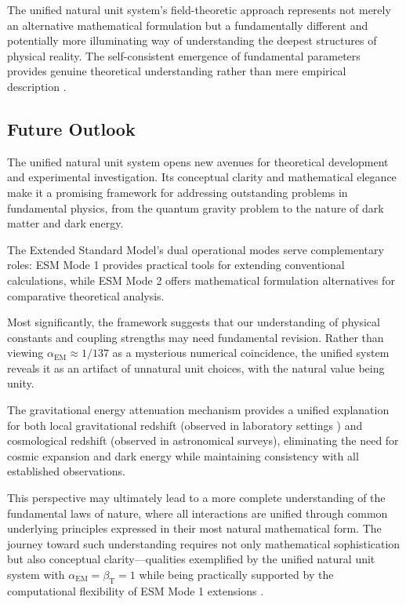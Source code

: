 \documentclass[12pt,a4paper]{article}
\newcommand{\alphaEM}{\alpha_{\text{EM}}}
\newcommand{\betaT}{\beta_{\text{T}}}
\begin{document}
	The unified natural unit system's field-theoretic approach represents not merely an alternative mathematical formulation but a fundamentally different and potentially more illuminating way of understanding the deepest structures of physical reality. The self-consistent emergence of fundamental parameters provides genuine theoretical understanding rather than mere empirical description \cite{pascher_pragmatic_2025}.
	
	\subsection{Future Outlook}
	\label{subsec:future_outlook}
	
	The unified natural unit system opens new avenues for theoretical development and experimental investigation. Its conceptual clarity and mathematical elegance make it a promising framework for addressing outstanding problems in fundamental physics, from the quantum gravity problem to the nature of dark matter and dark energy.
	
	The Extended Standard Model's dual operational modes serve complementary roles: ESM Mode 1 provides practical tools for extending conventional calculations, while ESM Mode 2 offers mathematical formulation alternatives for comparative theoretical analysis.
	
	Most significantly, the framework suggests that our understanding of physical constants and coupling strengths may need fundamental revision. Rather than viewing $\alphaEM \approx 1/137$ as a mysterious numerical coincidence, the unified system reveals it as an artifact of unnatural unit choices, with the natural value being unity.
	
	The gravitational energy attenuation mechanism provides a unified explanation for both local gravitational redshift (observed in laboratory settings \cite{Pound1960}) and cosmological redshift (observed in astronomical surveys), eliminating the need for cosmic expansion and dark energy while maintaining consistency with all established observations.
	
	This perspective may ultimately lead to a more complete understanding of the fundamental laws of nature, where all interactions are unified through common underlying principles expressed in their most natural mathematical form. The journey toward such understanding requires not only mathematical sophistication but also conceptual clarity—qualities exemplified by the unified natural unit system with $\alphaEM = \betaT = 1$ while being practically supported by the computational flexibility of ESM Mode 1 extensions \cite{pascher_unified_2025,pascher_lagrangian_2025}.
	
\end{document}
